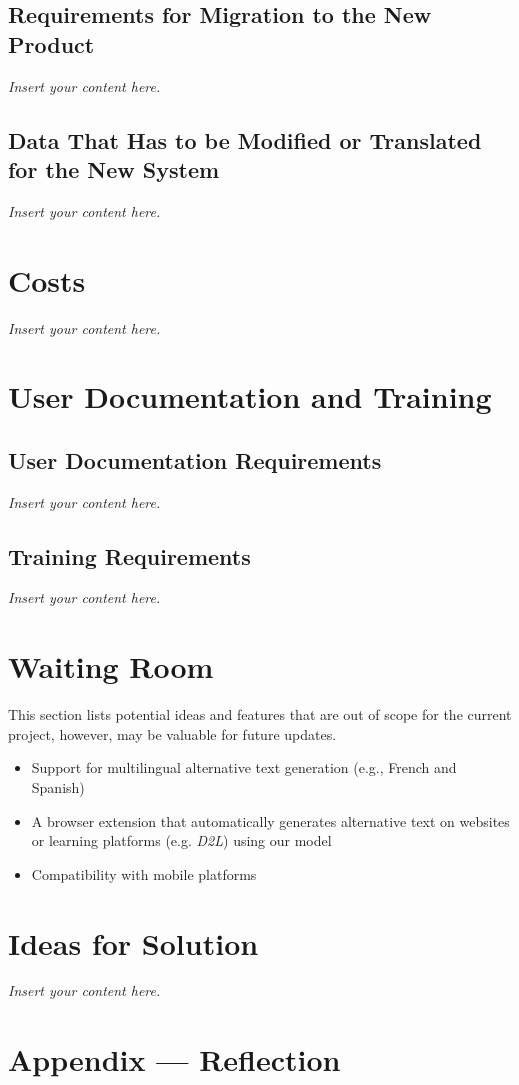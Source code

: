\documentclass[12pt]{article}
\newcommand{\lips}{\textit{Insert your content here.}}
\begin{document}
\subsection{Requirements for Migration to the New Product}
\lips
\subsection{Data That Has to be Modified or Translated for the New System}
\lips

\section{Costs}
\lips
\section{User Documentation and Training}
\subsection{User Documentation Requirements}
\lips
\subsection{Training Requirements}
\lips

\section{Waiting Room}
This section lists potential ideas and features that are out of scope for the current project, however, may be valuable for future updates. 
\begin{itemize}
  \item Support for multilingual alternative text generation (e.g., French and Spanish)
  \item A browser extension that automatically generates alternative text on websites or learning platforms (e.g. \textit{D2L}) using our model
  \item Compatibility with mobile platforms 
\end{itemize}

\section{Ideas for Solution}
\lips

\newpage{}
\section*{Appendix --- Reflection}




\end{document}
